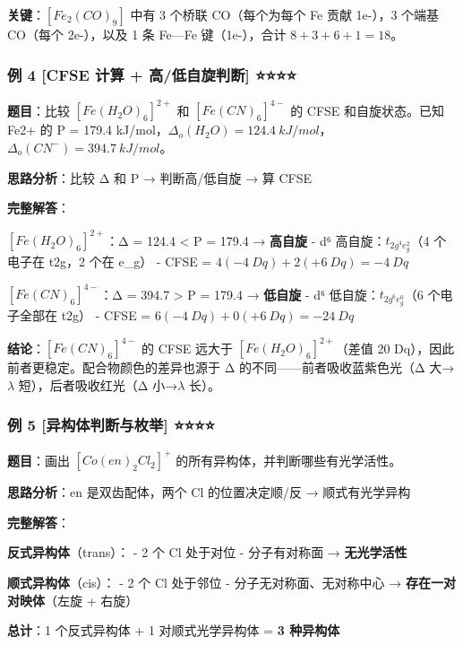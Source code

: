 \documentclass[a4paper,11pt]{ctexart}
\begin{document}
\textbf{关键}：\([Fe_2(CO)_9]\) 中有 3 个桥联 CO（每个为每个 Fe 贡献 1e-），3 个端基 CO（每个 2e-），以及 1 条 Fe---Fe 键（1e-），合计 \(8 + 3 + 6 + 1 = 18\)。

\subsubsection{例 4 {[}CFSE 计算 + 高/低自旋判断{]} ⭐⭐⭐⭐}\label{ux4f8b-4-cfse-ux8ba1ux7b97-ux9ad8ux4f4eux81eaux65cbux5224ux65ad}

\textbf{题目}：比较 \([Fe(H_2O)_6]^{2+}\) 和 \([Fe(CN)_6]^{4-}\) 的 CFSE 和自旋状态。已知 Fe2+ 的 P = 179.4 kJ/mol，\(\Delta_o(H_2O) = 124.4\ kJ/mol\)，\(\Delta_o(CN^-) = 394.7\ kJ/mol\)。

\textbf{思路分析}：比较 Δ 和 P → 判断高/低自旋 → 算 CFSE

\textbf{完整解答}：

\textbf{\([Fe(H_2O)_6]^{2+}\)}：Δ = 124.4 \textless{} P = 179.4 → \textbf{高自旋}
- d⁶ 高自旋：\(t_{2g^4 e_g^2}\)（4 个电子在 t2g，2 个在 e\_g）
- CFSE = \(4(-4\ Dq) + 2(+6\ Dq) = -4\ Dq\)

\textbf{\([Fe(CN)_6]^{4-}\)}：Δ = 394.7 \textgreater{} P = 179.4 → \textbf{低自旋}
- d⁶ 低自旋：\(t_{2g^6 e_g^0}\)（6 个电子全部在 t2g）
- CFSE = \(6(-4\ Dq) + 0(+6\ Dq) = -24\ Dq\)

\textbf{结论}：\([Fe(CN)_6]^{4-}\) 的 CFSE 远大于 \([Fe(H_2O)_6]^{2+}\)（差值 20 Dq），因此前者更稳定。配合物颜色的差异也源于 Δ 的不同------前者吸收蓝紫色光（Δ 大→\(\lambda\) 短），后者吸收红光（Δ 小→\(\lambda\) 长）。

\subsubsection{例 5 {[}异构体判断与枚举{]} ⭐⭐⭐⭐}\label{ux4f8b-5-ux5f02ux6784ux4f53ux5224ux65adux4e0eux679aux4e3e}

\textbf{题目}：画出 \([Co(en)_2Cl_2]^+\) 的所有异构体，并判断哪些有光学活性。

\textbf{思路分析}：en 是双齿配体，两个 Cl 的位置决定顺/反 → 顺式有光学异构

\textbf{完整解答}：

\textbf{反式异构体}（trans）：
- 2 个 Cl 处于对位
- 分子有对称面 → \textbf{无光学活性}

\textbf{顺式异构体}（cis）：
- 2 个 Cl 处于邻位
- 分子无对称面、无对称中心 → \textbf{存在一对对映体}（左旋 + 右旋）

\textbf{总计}：1 个反式异构体 + 1 对顺式光学异构体 = \textbf{3 种异构体}
\end{document}
